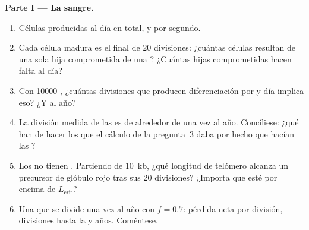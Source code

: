 \begin{problem}
\medskip
\noindent\textbf{Parte I --- La sangre.}
\begin{enumerate}
  \item Células producidas al día en total, y por segundo.
  \item Cada célula madura es el final de $20$ divisiones: ¿cuántas
        células resultan de una sola hija comprometida de una ? ¿Cuántas hijas comprometidas hacen falta al día?
  \item Con \num{10000} , ¿cuántas divisiones que producen
        diferenciación por  y día implica eso? ¿Y al año?
  \item La división medida de las  es de alrededor de una
        vez al año. Concíliese: ¿qué han de hacer los  que
        el cálculo de la pregunta~3 daba por hecho que hacían las
        ?
  \item Los  no tienen . Partiendo de
        \qty{10}{kb}, ¿qué longitud de telómero alcanza un precursor de
        glóbulo rojo tras sus $20$ divisiones? ¿Importa que esté por
        encima de $L_{\text{crit}}$?
  \item Una  que se divide una vez al año con $f = 0.7$:
        pérdida neta por división, divisiones hasta la  y
        años. Coméntese.
\end{enumerate}


\end{problem}
